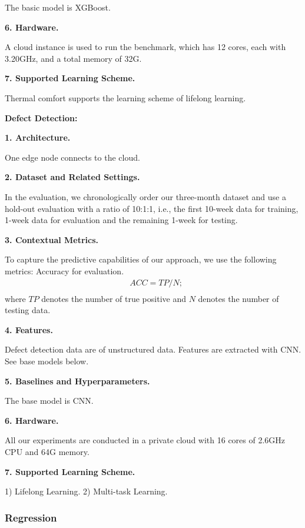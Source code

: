 The basic model is XGBoost.

\textbf{6. Hardware.}

A cloud instance is used to run the benchmark, which has 12 cores, each with 3.20GHz, and a total memory of 32G.

\textbf{7. Supported Learning Scheme.}

Thermal comfort supports the learning scheme of lifelong learning. 
 
\vspace{0.2cm} \noindent
\textbf{Defect Detection:}

\textbf{1. Architecture.}

One edge node connects to the cloud. 

\textbf{2. Dataset and Related Settings.}

In the evaluation, we chronologically order our three-month dataset and use a hold-out evaluation with a ratio of 10:1:1, i.e., the first 10-week data for training, 1-week data for evaluation and the remaining 1-week for testing.

\textbf{3. Contextual Metrics.}

To capture the predictive capabilities of our approach, we use the following metrics: Accuracy for evaluation.
\noindent
\begin{equation*}
\begin{split}
&ACC = TP / N; \\
\end{split}
\end{equation*}
where $TP$ denotes the number of true positive and $N$ denotes the number of testing data. 

\textbf{4. Features.}

Defect detection data are of unstructured data. Features are extracted with CNN. See base models below.

\textbf{5. Baselines and Hyperparameters.}

The base model is CNN. 


\textbf{6. Hardware.}

All our experiments are conducted in a private cloud with 16 cores of 2.6GHz CPU and 64G memory.

\textbf{7. Supported Learning Scheme.}

1) Lifelong Learning. 2) Multi-task Learning. 


\subsubsection{Regression}

